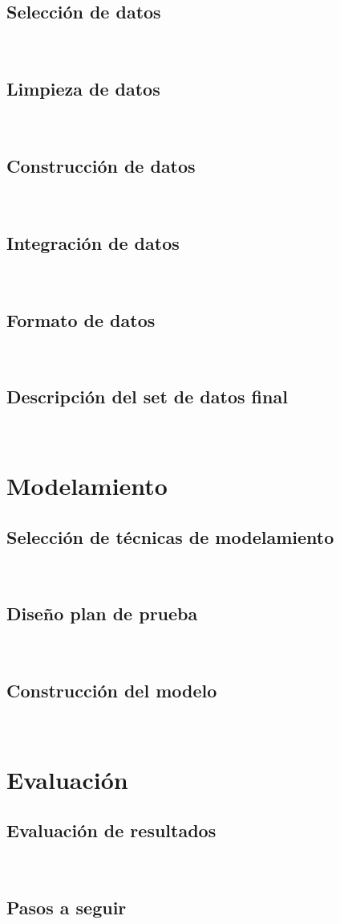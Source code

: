 \subsection{Selección de datos}
\blindtext\\
\subsection{Limpieza de datos}
\blindtext\\
\subsection{Construcción de datos}
\blindtext\\
\subsection{Integración de datos}
\blindtext\\
\subsection{Formato de datos}
\blindtext\\
\subsection{Descripción del set de datos final}
\blindtext\\

\section{Modelamiento}
\blindtext
\subsection{Selección de técnicas de modelamiento}
\blindtext\\
\subsection{Diseño plan de prueba}
\blindtext\\
\subsection{Construcción del modelo}
\blindtext\\


\section{Evaluación}
\blindtext
\subsection{Evaluación de resultados}
\blindtext\\
\subsection{Pasos a seguir}
\blindtext\\